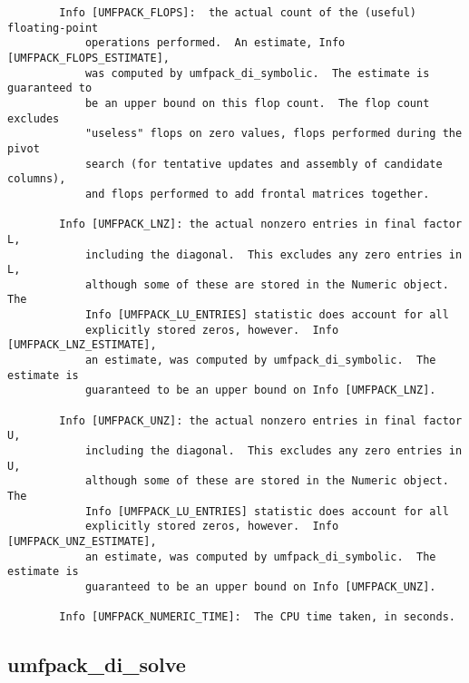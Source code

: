 \documentclass[11pt]{article}
\begin{document}
{\begin{verbatim}
        Info [UMFPACK_FLOPS]:  the actual count of the (useful) floating-point
            operations performed.  An estimate, Info [UMFPACK_FLOPS_ESTIMATE],
            was computed by umfpack_di_symbolic.  The estimate is guaranteed to
            be an upper bound on this flop count.  The flop count excludes
            "useless" flops on zero values, flops performed during the pivot
            search (for tentative updates and assembly of candidate columns),
            and flops performed to add frontal matrices together.

        Info [UMFPACK_LNZ]: the actual nonzero entries in final factor L,
            including the diagonal.  This excludes any zero entries in L,
            although some of these are stored in the Numeric object.  The
            Info [UMFPACK_LU_ENTRIES] statistic does account for all
            explicitly stored zeros, however.  Info [UMFPACK_LNZ_ESTIMATE],
            an estimate, was computed by umfpack_di_symbolic.  The estimate is
            guaranteed to be an upper bound on Info [UMFPACK_LNZ].

        Info [UMFPACK_UNZ]: the actual nonzero entries in final factor U,
            including the diagonal.  This excludes any zero entries in U,
            although some of these are stored in the Numeric object.  The
            Info [UMFPACK_LU_ENTRIES] statistic does account for all
            explicitly stored zeros, however.  Info [UMFPACK_UNZ_ESTIMATE],
            an estimate, was computed by umfpack_di_symbolic.  The estimate is
            guaranteed to be an upper bound on Info [UMFPACK_UNZ].

        Info [UMFPACK_NUMERIC_TIME]:  The CPU time taken, in seconds.
\end{verbatim}
}

\newpage
\subsection{umfpack\_di\_solve}
\end{document}
